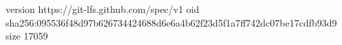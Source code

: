 version https://git-lfs.github.com/spec/v1
oid sha256:095536f48d97b626734424688d6e6a4b62f23d5f1a7ff742dc07be17cdfb93d9
size 17059

